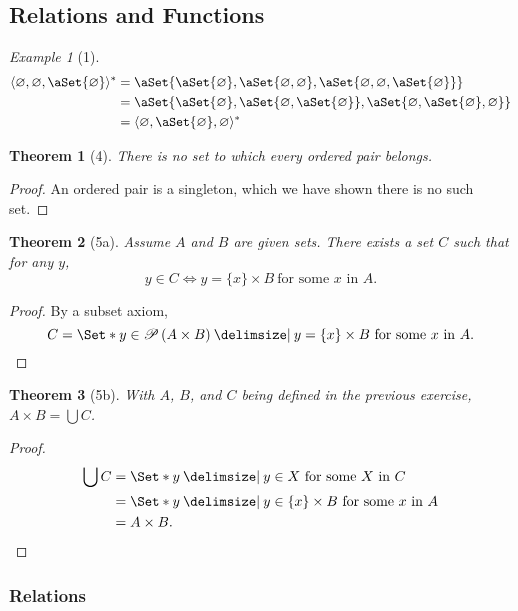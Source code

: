 \documentclass[12pt]{article}
\theoremstyle{plain}
\newtheorem*{exthm}{Theorem}
\theoremstyle{remark}
\newtheorem*{eg}{Example}
\theoremstyle{definition}
\theoremstyle{remark}
\newcommand{\powerset}{\mathscr{P}\,}
\providecommand\st{}
\newcommand\SetSymbol[1][]{%
  \nonscript\:#1\vert%
  \allowbreak%
  \nonscript\:
\mathopen{}}
\DeclarePairedDelimiter{\ang}{\langle}{\rangle}
\renewcommand\st{\SetSymbol[\delimsize]}
\DeclarePairedDelimiter\aSet\{\}
\renewcommand{\iff}{\Leftrightarrow}
\begin{document}
\subsection{Relations and Functions}
\begin{eg}[1]
  \begin{align*}
    \ang{\varnothing, \varnothing, \aSet{\varnothing}}^* &=
    \aSet{\aSet{\varnothing}, \aSet{\varnothing, \varnothing}, \aSet{\varnothing, \varnothing, \aSet{\varnothing}}}\\
                                                         &=  \aSet{\aSet{\varnothing}, \aSet{\varnothing, \aSet{\varnothing}}, \aSet{\varnothing, \aSet{\varnothing}, \varnothing}}\\
                                                         &= \ang{\varnothing, \aSet{\varnothing}, \varnothing}^*
  \end{align*}
\end{eg}
\begin{exthm}[4]
  There is no set to which every ordered pair belongs.
\end{exthm}
\begin{proof}
  An ordered pair is a singleton, which we have shown there is no such set.
\end{proof}
\begin{exthm}[5a]
  Assume $A$ and $B$ are given sets. There exists a set $C$ such that for any $y$,
  \[
    y \in C \iff y = \{x\} \times B\ \text{for some $x$ in $A$}.
  \]
\end{exthm}
\begin{proof}
  By a subset axiom,
  \[
    C = \Set*{y \in \powerset (A \times B) \st y = \{x\} \times B\ \text{for some $x$ in $A$}}.
  \]
\end{proof}
\begin{exthm}[5b]
  With $A$, $B$, and $C$ being defined in the previous exercise, $A \times B = \bigcup C$.
\end{exthm}
\begin{proof}
  \begin{align*}
    \bigcup C &= \Set*{y \st y \in X\ \text{for some $X$ in $C$}}\\
              &= \Set*{y \st y \in \{x\} \times B\ \text{for some $x$ in $A$}}\\
              &= A \times B.
  \end{align*}
\end{proof}

\subsubsection{Relations}
\end{document}
